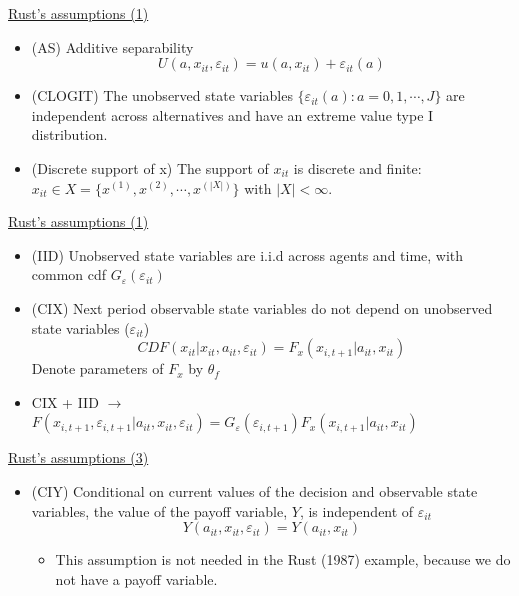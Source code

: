 \documentclass[aspectratio=169]{beamer}
\begin{document}
	\begin{frame}{\hyperlink{vf}{Rust's assumptions (1)}}
		\begin{itemize}
			\itemsep1em
			\item (AS) Additive separability
			\begin{equation*}
				U(a,x_{it},\varepsilon_{it}) = u(a,x_{it}) + \varepsilon_{it}(a)
			\end{equation*}
			\item (CLOGIT) The unobserved state variables $\{\varepsilon_{it}(a): a = 0,1,\cdots,J\}$ are independent across alternatives and have an extreme value type I distribution.
			\item (Discrete support of x) The support of $x_{it}$ is discrete and finite: $x_{it} \in X = \{x^{(1)},x^{(2)},\cdots,x^{(|X|)}\}$ with $|X| < \infty$.
		\end{itemize}
	\end{frame}
	
	\begin{frame}{\hyperlink{vf}{Rust's assumptions (1)}}
		\begin{itemize}
			\itemsep1em
			\item (IID) Unobserved state variables are i.i.d across agents and time, with common cdf $G_\varepsilon(\varepsilon_{it})$
			\item (CIX) Next period observable state variables do not depend on unobserved state variables ($\varepsilon_{it}$)
			$$CDF(x_{it}|x_{it},a_{it},\varepsilon_{it}) = F_x(x_{i,t+1}|a_{it},x_{it})$$
			Denote parameters of $F_x$ by $\theta_f$
			\item CIX + IID $\rightarrow$ $F(x_{i,t+1},\varepsilon_{i,t+1}|a_{it},x_{it},\varepsilon_{it}) = G_\varepsilon(\varepsilon_{i,t+1}) F_x(x_{i,t+1}|a_{it},x_{it})$
		\end{itemize}
	\end{frame}
	
	\begin{frame}{\hyperlink{vf}{Rust's assumptions (3)}}
		\begin{itemize}
			\itemsep1em
			\item (CIY) Conditional on current values of the decision and observable state variables, the value of the payoff variable, $Y$, is independent of $\varepsilon_{it}$
			$$Y(a_{it},x_{it},\varepsilon_{it}) = Y(a_{it},x_{it})$$
			\begin{itemize}
				\item This assumption is not needed in the Rust (1987) example, because we do not have a payoff variable.
			\end{itemize}
		\end{itemize}
	\end{frame}
	
\end{document}
